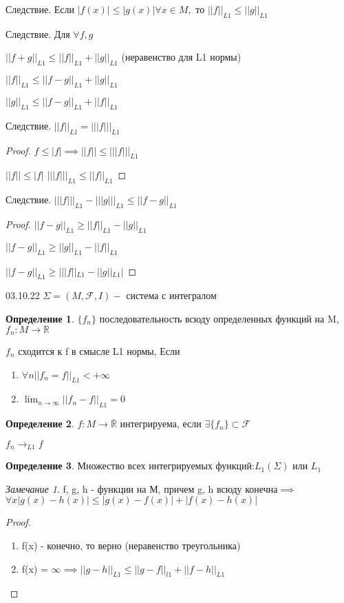 \documentclass[a4paper, 12pt]{article}
\theoremstyle{definition}
\newtheorem*{definition}{Определение}
\theoremstyle{remark}
\newtheorem*{remark}{Замечание}
\begin{document}
Следствие. Если $|f(x)|\leq |g(x)| \forall x \in M,$ то $||f||_{L1}\leq ||g||_{L1}$

Следствие. Для $\forall f, g$

$||f+g||_{L1}\leq ||f||_{L1} + ||g||_{L1}$ (неравенство для L1 нормы)

$||f||_{L1}\leq ||f-g||_{L1} + ||g||_{L1}$

$||g||_{L1} \leq ||f-g||_{L1}+||f||_{L1}$

Следствие. $||f||_{L1} = |||f|||_{L1}$
\begin{proof}
     $f\leq |f|\implies ||f||\leq |||f|||_{L1}$

     $||f||\leq |f|$
     $|||f|||_{L1}\leq ||f||_{L1}$
\end{proof}
Следствие. $|||f|||_{L1}  - |||g|||_{L1}\leq ||f-g||_{L1}$
\begin{proof}
     $||f-g||_{L1}\geq ||f||_{L1} - ||g||_{L1}$

     $||f - g||_{L1}\geq ||g||_{L1} - ||f||_{L1}$

     $||f-g||_{L1}\geq| ||f||_{L1} - ||g||_{L1}|$
\end{proof}
03.10.22
$\Sigma = (M, \mathcal{F} , I) -$ система с интегралом
\begin{definition}
     $\{f_n\}$ последовательность всюду определенных функций на M, $f_n: M\to \mathbb{R} $

     $f_n$ сходится к f в смысле L1 нормы, Если
     \begin{enumerate}
          \item $\forall n ||f_n = f||_{L1}< +\infty$
          \item $\lim_{n \to \infty} ||f_n - f||_{L1} = 0 $
     \end{enumerate}
\end{definition}
\begin{definition}
     $f: M\to \bar{\mathbb{R} }$ интегрируема, если $\exists \{f_n\}\subset \mathcal{F} $

     $f_n\to_{L1}f$
\end{definition}
\begin{definition}
     Множество всех интегрируемых функций:$L_1(\Sigma)$ или $L_1$
\end{definition}
     \begin{remark}
         f, g, h -  функции на М, причем g, h всюду конечна$\implies$
         $\forall x |g(x) - h(x)|\leq |g(x) - f(x)| +|f(x)- h(x)|$
     \end{remark}
     \begin{proof}
          \begin{enumerate}
               \item f(x) -  конечно, то верно (неравенство треугольника)
               \item f(x) = $\infty\implies ||g-h||_{L1}\leq ||g-f||_{l1}+ ||f-h||_{L1}$
          \end{enumerate}
     \end{proof}
\end{document}
